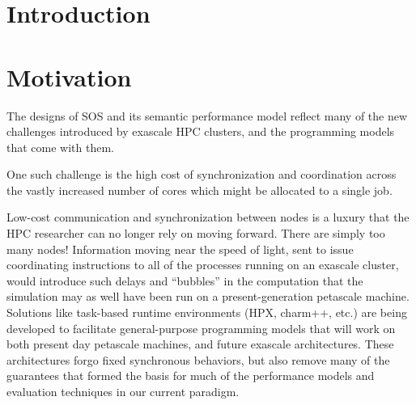 
\section{Introduction}





\section{Motivation}

The designs of SOS and its semantic performance model reflect many of
the new challenges introduced by exascale HPC clusters, and the
programming models that come with them.

One such challenge is the high cost of synchronization and
coordination across the vastly increased number of cores which might
be allocated to a single job.

Low-cost communication and synchronization between nodes is a luxury
that the HPC researcher can no longer rely on moving forward. There
are simply too many nodes! Information moving near the speed of light,
sent to issue coordinating instructions to all of the processes
running on an exascale cluster, would introduce such delays and
``bubbles'' in the computation that the simulation may as well have
been run on a present-generation petascale
machine.  Solutions like task-based runtime
environments (HPX, charm++, etc.)  are being developed to facilitate
general-purpose programming models that will work on both present day
petascale machines, and future exascale architectures. These
architectures forgo fixed synchronous behaviors, but also remove many
of the guarantees that formed the basis for much of the performance
models and evaluation techniques in our current paradigm.

